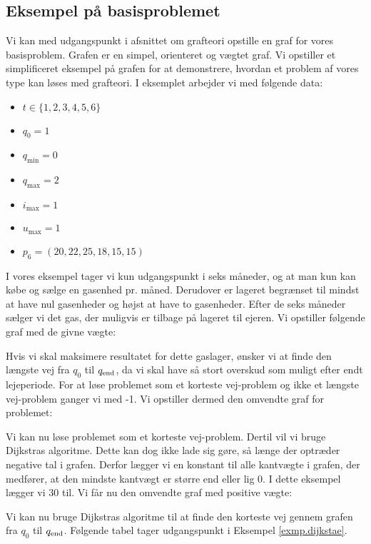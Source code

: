 \subsection{Eksempel på basisproblemet} \label{kap:graf_basis}
Vi kan med udgangspunkt i afsnittet om grafteori opstille en graf for vores basisproblem. Grafen er en simpel, orienteret og vægtet graf. Vi opstiller et simplificeret eksempel på grafen for at demonstrere, hvordan et problem af vores type kan løses med grafteori. I eksemplet arbejder vi med følgende data:
\begin{itemize}
  \item $t \in \{1,2,3,4,5,6\}$
  \item $q_{0}=1$
  \item $q_{\min}=0$
  \item $q_{\max}=2$
  \item $i_{\max}=1$
  \item $u_{\max}=1$
  \item $p_{6}=(20,22,25,18,15,15)$
\end{itemize}

I vores eksempel tager vi kun udgangspunkt i seks måneder, og at man kun kan købe og sælge en gasenhed pr. måned. Derudover er lageret begrænset til mindst at have nul gasenheder og højst at have to gasenheder. Efter de seks måneder sælger vi det gas, der muligvis er tilbage på lageret til ejeren. Vi opstiller følgende graf med de givne vægte:



Hvis vi skal maksimere resultatet for dette gaslager, ønsker vi at finde den længste vej fra $q_{0}$ til $q_{\textrm{end}}$, da vi skal have så stort overskud som muligt efter endt lejeperiode. For at løse problemet som et korteste vej-problem og ikke et længste vej-problem ganger vi med -1. Vi opstiller dermed den omvendte graf for problemet:



Vi kan nu løse problemet som et korteste vej-problem. Dertil vil vi bruge Dijkstras algoritme. Dette kan dog ikke lade sig gøre, så længe der optræder negative tal i grafen. Derfor lægger vi en konstant til alle kantvægte i grafen, der medfører, at den mindste kantvægt er større end eller lig 0. I dette eksempel lægger vi 30 til. Vi får nu den omvendte graf med positive vægte:




Vi kan nu bruge Dijkstras algoritme til at finde den korteste vej gennem grafen fra $q_0$ til $q_{\textrm{end}}$. Følgende tabel tager udgangspunkt i Eksempel \ref{exmp.dijkstae}.

